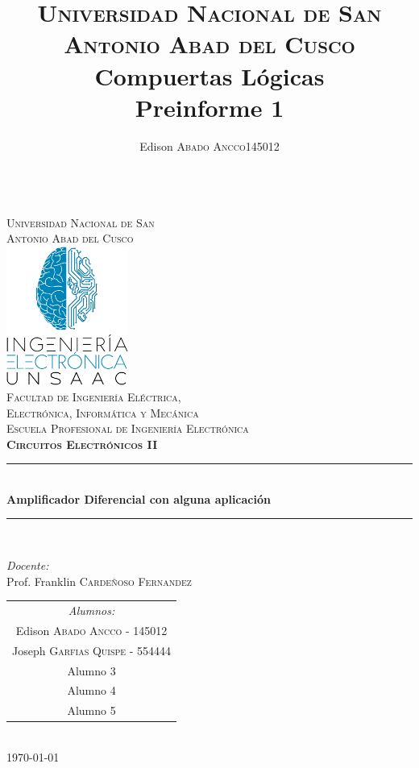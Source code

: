 \documentclass[a4paper]{article} %
\title{
	\textsc{Universidad Nacional de San Antonio Abad del Cusco}\\
	\textbf{Compuertas Lógicas}\\
	Preinforme 1}
\author{
	\begin{tabular}{lr}
		Edison \textsc{Abado Ancco} & 145012 \\
	\end{tabular}
}
\begin{document}
	\begin{titlepage}
		\newcommand{\HRule}{\rule{\linewidth}{0.5mm}} 
		\center
		\textsc{\LARGE \vspace{1.1cm} \\ Universidad Nacional de San \\[0.2cm] Antonio Abad del Cusco}\\[1.2cm] 
		\includegraphics[width=4cm]{IMAGENES/logoLiC}\\[1cm]
		\textsc{\Large Facultad de Ingeniería Eléctrica, \\ Electrónica, Informática y Mecánica}\\[0.5cm] 
		\textsc{\large Escuela Profesional de Ingeniería Electrónica}\\[0.5cm]
		\textsc{\Large \textbf{Circuitos Electrónicos II}}\\[0.5cm] 
		\HRule \\[0.4cm]
		{ \huge \bfseries Amplificador Diferencial con alguna aplicación}\\[0.30cm] 
		\HRule \\[1.4cm]
		\begin{minipage}{\textwidth}
			\center 
			
			\emph{Docente:} \\
			Prof. Franklin  \textsc{Cardeñoso Fernandez} \\[1cm]
			
			\begin{tabular}{c}
				\emph{Alumnos:}  \\
				Edison   \textsc{Abado Ancco} - 145012 \\
				Joseph \textsc{Garfias Quispe} - 554444 \\
				Alumno 3 \\
				Alumno 4 \\
				Alumno 5
			\end{tabular}
		\end{minipage}\\[2cm]
		\today
	\end{titlepage}
	
\end{document}
